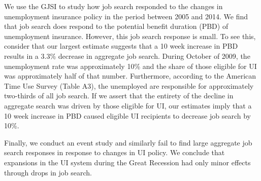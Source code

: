 \documentclass[12pt]{article}
\begin{document}
\begin{spacing}{2}
We use the GJSI to study how job search responded to the changes in unemployment insurance policy in the period between 2005 and 2014. We find that job search does respond to the potential benefit duration (PBD) of unemployment insurance. However, this job search response is small. To see this, consider that our largest estimate suggests that a 10 week increase in PBD results in a 3.3\% decrease in aggregate job search. During October of 2009, the unemployment rate was approximately 10\% and the share of those eligible for UI was approximately half of that number. Furthermore, according to the American Time Use Survey (Table A3), the unemployed are responsible for approximately two-thirds of all job search. If we assert that the entirety of the decline in aggregate search was driven by those eligible for UI, our estimates imply that a 10 week increase in PBD caused eligible UI recipients to decrease job search by 10\%.

Finally, we conduct an event study and similarly fail to find large aggregate job search responses in response to changes in UI policy. We conclude that expansions in the UI system during the Great Recession had only minor effects through drops in job search.





\newpage





\newpage


\end{spacing}
\end{document}
